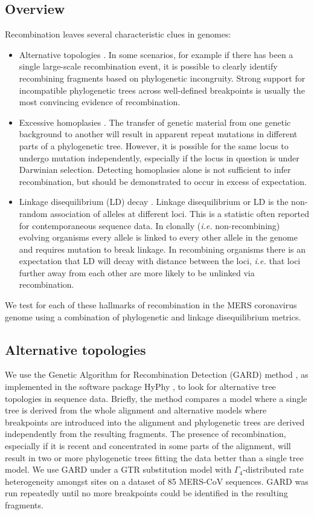\documentclass[11pt,oneside,letterpaper]{article}
\begin{document}
\subsection*{Overview}
Recombination leaves several characteristic clues in genomes:
\begin{itemize}
\item{Alternative topologies \citep{robertson_aids_1995,robertson_hiv_1995,holmes_1999}. 
In some scenarios, for example if there has been a single large-scale recombination event, it is possible to clearly identify recombining fragments based on phylogenetic incongruity.
Strong support for incompatible phylogenetic trees across well-defined breakpoints is usually the most convincing evidence of recombination.}
\item{Excessive homoplasies \citep{smith_1998}.
The transfer of genetic material from one genetic background to another will result in apparent repeat mutations in different parts of a phylogenetic tree.
However, it is possible for the same locus to undergo mutation independently, especially if the locus in question is under Darwinian selection.
Detecting homoplasies alone is not sufficient to infer recombination, but should be demonstrated to occur in excess of expectation.}
\item{Linkage disequilibrium (LD) decay \citep{meunier_2001}.
Linkage disequilibrium or LD is the non-random association of alleles at different loci.
This is a statistic often reported for contemporaneous sequence data.
In clonally (\textit{i.e.} non-recombining) evolving organisms every allele is linked to every other allele in the genome and requires mutation to break linkage.
In recombining organisms there is an expectation that LD will decay with distance between the loci, \textit{i.e.} that loci further away from each other are more likely to be unlinked via recombination.}
\end{itemize}
We test for each of these hallmarks of recombination in the MERS coronavirus genome using a combination of phylogenetic and linkage disequilibrium metrics.

\subsection*{Alternative topologies}
We use the Genetic Algorithm for Recombination Detection (GARD) method \citep{pond_2006}, as implemented in the software package HyPhy \citep{pond_2005}, to look for alternative tree topologies in sequence data.
Briefly, the method compares a model where a single tree is derived from the whole alignment and alternative models where breakpoints are introduced into the alignment and phylogenetic trees are derived independently from the resulting fragments.
The presence of recombination, especially if it is recent and concentrated in some parts of the alignment, will result in two or more phylogenetic trees fitting the data better than a single tree model.
We use GARD under a GTR \citep{tavare_1986} substitution model with $\Gamma_{4}$-distributed rate heterogeneity amongst sites \citep{yang_1994} on a dataset of 85 MERS-CoV sequences.
GARD was run repeatedly until no more breakpoints could be identified in the resulting fragments.
\end{document}
